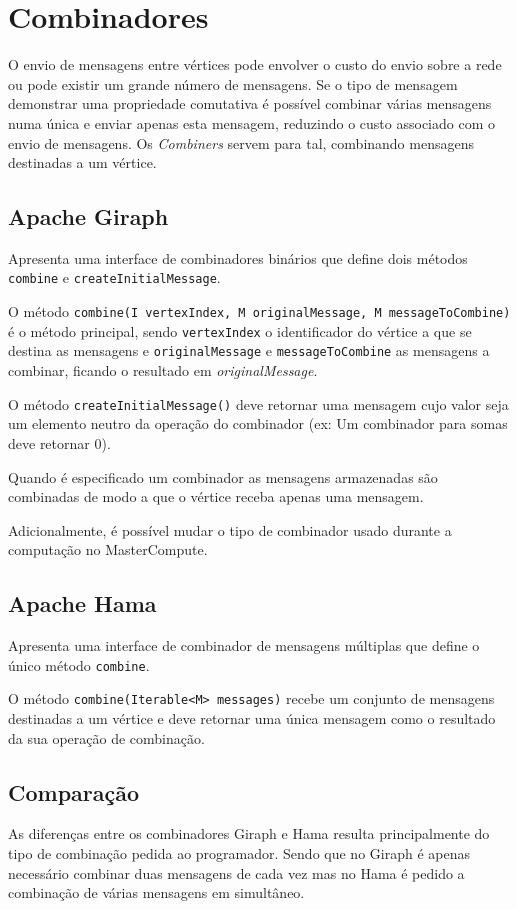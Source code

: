 \newpage
\section{Combinadores}
O envio de mensagens entre vértices pode envolver o custo do envio sobre a rede ou pode existir um grande número de mensagens. Se o tipo de mensagem demonstrar uma propriedade comutativa é possível combinar várias mensagens numa única e enviar apenas esta mensagem, reduzindo o custo associado com o envio de mensagens. Os \textit{Combiners} servem para tal, combinando mensagens destinadas a um vértice.

\subsection*{Apache Giraph}
Apresenta uma interface de combinadores binários que define dois métodos \texttt{combine} e \texttt{createInitialMessage}.

O método \texttt{combine(I vertexIndex, M originalMessage, M messageToCombine)} é o método principal, sendo \texttt{vertexIndex} o identificador do vértice a que se destina as mensagens e \texttt{originalMessage} e \texttt{messageToCombine} as mensagens a combinar, ficando o resultado em \textsl{originalMessage}.

O método \texttt{createInitialMessage()} deve retornar uma mensagem cujo valor seja um elemento neutro da operação do combinador (ex: Um combinador para somas deve retornar 0).

Quando é especificado um combinador as mensagens armazenadas são combinadas de modo a que o vértice receba apenas uma mensagem.

Adicionalmente, é possível mudar o tipo de combinador usado durante a computação no MasterCompute.
\subsection*{Apache Hama}
Apresenta uma interface de combinador de mensagens múltiplas que define o único método \texttt{combine}.

O método \texttt{combine(Iterable<M> messages)} recebe um conjunto de mensagens destinadas a um vértice e deve retornar uma única mensagem como o resultado da sua operação de combinação.


\subsection*{Comparação}
As diferenças entre os combinadores Giraph e Hama resulta principalmente do tipo de combinação pedida ao programador. Sendo que no Giraph é apenas necessário combinar duas mensagens de cada vez mas no Hama é pedido a combinação de várias mensagens em simultâneo.

